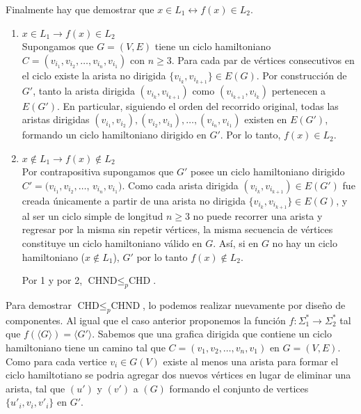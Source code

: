 Finalmente hay que demostrar que $x \in L_1 \leftrightarrow f(x) \in L_2$. 
\begin{enumerate}
    \item $x \in L_1 \rightarrow f(x) \in L_2$\\

    Supongamos que $G = (V, E)$ tiene un ciclo hamiltoniano $C = (v_{i_1}, v_{i_2}, \dots, v_{i_n}, v_{i_1})$ con $n \ge 3$. Para cada par de vértices consecutivos en el ciclo existe la arista no dirigida $\{v_{i_k}, v_{i_{k+1}}\} \in E(G)$. Por construcción de $G'$, tanto la arista dirigida $(v_{i_k}, v_{i_{k+1}})$ como $(v_{i_{k+1}}, v_{i_k})$ pertenecen a $E(G')$. En particular, siguiendo el orden del recorrido original, todas las aristas dirigidas $(v_{i_1}, v_{i_2}), (v_{i_2}, v_{i_3}), \dots, (v_{i_n}, v_{i_1})$ existen en $E(G')$, formando un ciclo hamiltoniano dirigido en $G'$. Por lo tanto, $f(x) \in L_2$.\\
    
    \item $x \notin L_1 \rightarrow f(x) \notin L_2$\\

    Por contrapositiva supongamos que $G'$ posee un ciclo hamiltoniano dirigido $C' = (v_{i_1}, v_{i_2}, \dots$,  $ v_{i_n}, v_{i_1})$. Como cada arista dirigida $(v_{i_k}, v_{i_{k+1}}) \in E(G')$ fue creada únicamente a partir de una arista no dirigida $\{v_{i_k}, v_{i_{k+1}}\} \in E(G)$, y al ser un ciclo simple de longitud $n \ge 3$ no puede recorrer una arista y regresar por la misma sin repetir vértices, la misma secuencia de vértices constituye un ciclo hamiltoniano válido en $G$. Así, si en $G$ no hay un ciclo hamiltoniano ($x \notin L_1$), $G'$ por lo tanto $f(x) \notin L_2$.

    Por 1 y por 2,  $\text{CHND} \le_p \text{CHD}$. 
    
\end{enumerate}

    Para demostrar \textbf{$\text{CHD} \le_p \text{CHND}$}, lo podemos realizar nuevamente por diseño de componentes. Al igual que el caso anterior proponemos la función $f: \Sigma_1^* \rightarrow \Sigma_2^*$ tal que $f(\langle G \rangle) = \langle G' \rangle$. Sabemos que una grafica dirigida que contiene un ciclo hamiltoniano tiene un camino tal que $C = (v_{1}, v_{2}, \dots, v_{n}, v_{1})$ en $G = (V,E)$. Como para cada vertice $v_i \in G(V)$ existe al menos una arista para formar el ciclo hamiltotiano se podria agregar dos nuevos vértices en lugar de eliminar una arista, tal que $(u')$ y $(v') $ a  $(G)$ formando el conjunto de vertices $\{u'_i, v_i, v'_i\}$ en $G'$.\\


